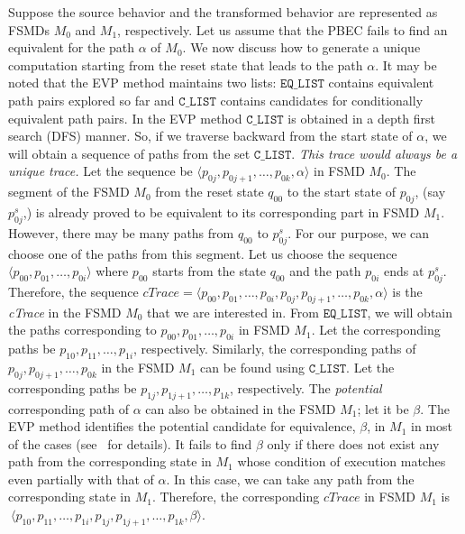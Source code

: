 Suppose the source behavior and the transformed behavior are
represented as FSMDs $M_0$ and $M_1$, respectively. Let us assume that the
PBEC fails to find an equivalent for
the path $\alpha$ of $M_0$. We now discuss how to generate a
unique computation starting from the reset state that leads to the path
$\alpha$. It may be noted that the EVP method maintains two lists:
$\mathtt{EQ\_LIST}$ contains equivalent path pairs explored so far and
$\mathtt{C\_LIST}$ contains candidates for conditionally equivalent path pairs.
In the EVP method $\mathtt{C\_LIST}$ is obtained in a
depth first search (DFS) manner. So, if we traverse backward from the start
state of $\alpha$, we will obtain a sequence of paths from the set
$\mathtt{C\_LIST}$. \textit{This trace would always be a unique trace.} Let the
sequence be $\langle p_{0j},p_{0j+1},\dots,p_{0k},\alpha \rangle$ in FSMD
$M_0$. The segment of the FSMD $M_0$ from the reset state $q_{00}$ to the start
state of $p_{0j}$, (say $p_{0j}^s$,) is already proved to be equivalent to its
corresponding part in FSMD $M_1$. However, there may be many paths from
$q_{00}$ to $p_{0j}^s$. For our purpose, we can choose one of the paths  from
this segment. Let us choose the sequence $\langle
p_{00},p_{01},\dots,p_{0i}\rangle$ where $p_{00}$ starts from the state
$q_{00}$ and the path $p_{0i}$ ends at $p_{0j}^s$. Therefore, the sequence
$\mathit{cTrace}=\langle
p_{00},p_{01},\dots,p_{0i},p_{0j},p_{0j+1},\dots,p_{0k},\alpha\rangle$ is the
\textit{cTrace} in the FSMD $M_0$ that we are interested in. From
$\mathtt{EQ\_LIST}$, we will obtain the paths corresponding to
$p_{00},p_{01},\dots,p_{0i}$ in FSMD $M_1$. Let the corresponding paths be
$p_{10},p_{11},\dots,p_{1i}$, respectively. Similarly, the corresponding paths
of $p_{0j},p_{0j+1},\dots,p_{0k}$ in the FSMD $M_1$ can be found using
$\mathtt{C\_LIST}$. Let the corresponding paths be
$p_{1j},p_{1j+1},\dots,p_{1k}$, respectively. The \textit{potential}
corresponding path of $\alpha$ can also be obtained in the FSMD $M_1$; let it
be $\beta$.  The EVP method identifies the potential candidate for equivalence,
$\beta$, in $M_1$ in most of the cases (see~\cite{Chouksey18} for details). It
fails to find $\beta$ only if there does not exist any path from the
corresponding state in $M_1$ whose condition of execution matches even partially
with that of $\alpha$. In this case, we can take any path from the
corresponding state in $M_1$. Therefore, the corresponding $cTrace$ in FSMD
$M_1$ is $~\langle
p_{10},p_{11},\dots,p_{1i},p_{1j},p_{1j+1},\dots,p_{1k},\beta\rangle$.
